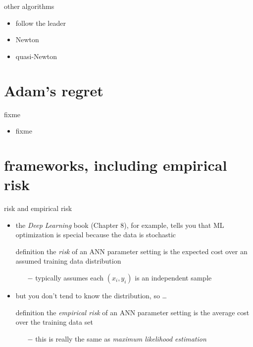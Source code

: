 \documentclass[xcolor={svgnames},
               hyperref={colorlinks,citecolor=DeepPink4,linkcolor=FireBrick,urlcolor=Maroon}]
               {beamer}
\begin{document}
\begin{frame}{other algorithms}

\begin{itemize}
\item follow the leader
\item Newton
\item quasi-Newton
\end{itemize}
\end{frame}


\section{Adam's regret}

\begin{frame}{fixme}

\begin{itemize}
\item fixme
\end{itemize}
\end{frame}


\section{frameworks, including empirical risk}

\begin{frame}{risk and empirical risk}

\begin{itemize}
\item the \emph{Deep Learning} book (Chapter 8), for example, tells you that ML optimization is special because the data is stochastic

\begin{block}{definition}
the \emph{risk} of an ANN parameter setting is the expected cost over an assumed  training data distribution
\end{block}

    \begin{itemize}
    \item[$-$] typically assumes each $(x_i,y_i)$ is an independent sample
    \end{itemize}

\item but you don't tend to know the distribution, so \dots

\begin{block}{definition}
the \emph{empirical risk} of an ANN parameter setting is the average cost over the training data set
\end{block}

    \begin{itemize}
    \item[$-$] this is really the same as \emph{maximum likelihood estimation}
    \end{itemize}

\end{itemize}
\end{frame}
\end{document}
